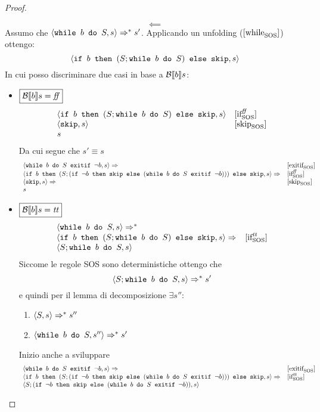 \begin{enumerate}
\begin{proof}
\begin{itemize}
\end{itemize}
$$
\boxed{\impliedby}
$$
Assumo che $\confSs{\wbS{b}{S}}{s} \Rar{*} s'$. Applicando un unfolding ($\whileSOS$) ottengo:
$$
\confSs{\ifABC{b}{(S; \wbS{b}{S})}{\skipForFriends}}{s}
$$
In cui posso discriminare due casi in base a $\B{b}$:
\begin{itemize}
\item $\boxed{\B{b} = \semfalse}$
$$
\begin{array}{ll}
\confSs{\ifABC{b}{(S; \wbS{b}{S})}{\skipForFriends}}{s} & \ifffSOS\\
\confSs{\skipForFriends}{s} & \skipSOS\\
s & \\
\end{array}
$$
Da cui segue che $\boxed{s' \equiv{ } s}$
$$
\begin{array}{ll}
\confSs{\wbSE{b}{S}{\neg b}}{s} \Rar{ } & \exitifSOS\\
\confSs{\ifABC{b}{(S; (\ifABC{\neg b}{\skipForFriends}{(\wbSE{b}{S}{\neg b})}))}{\skipForFriends}}{s} \Rar{} & \ifffSOS \\
\confSs{\skipForFriends}{s} \Rar{}& \skipSOS\\
s & \\
\end{array}
$$
\item $\boxed{\B{b} = \semtrue}$
$$
\begin{array}{ll}
\confSs{\wbS{b}{S}}{s} \Rar{*} & \\ 
\confSs{\ifABC{b}{(S; \wbS{b}{S})}{\skipForFriends}}{s} \Rar{} & \ifttSOS\\
\confSs{S; \wbS{b}{S}}{s} & \\
\end{array}
$$	
Siccome le regole SOS sono deterministiche ottengo che
$$
\confSs{S; \wbS{b}{S}}{s} \Rar{*} s'
$$
e quindi per il lemma di decomposizione $\exists s''$:
\begin{enumerate}
\item 
$\confSs{S}{s} \Rar{*} s''$
\label{hw6:FattoA}
\item $\confSs{\wbS{b}{S}}{s''} \Rar{*} s' $
\label{hw6:FattoB}
\end{enumerate}
Inizio anche a sviluppare 
$$
\begin{array}{ll}
	\confSs{\wbSE{b}{S}{\neg b}}{s} \Rar{ } & \exitifSOS\\
	\confSs{\ifABC{b}{(S; (\ifABC{\neg b}{\skipForFriends}{(\wbSE{b}{S}{\neg b})}))}{\skipForFriends}}{s} \Rar{} & \ifttSOS \\
	\confSs{S; (\ifABC{\neg b}{\skipForFriends}{(\wbSE{b}{S}{\neg b})})}{s} & \\

\end{array}$$
\end{itemize}
\end{proof}
\end{enumerate}
